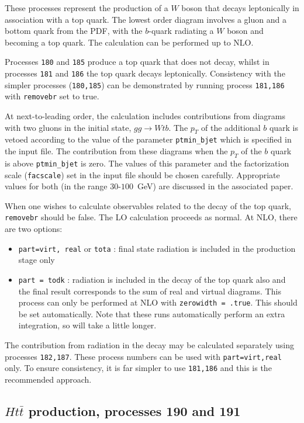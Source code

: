 \documentclass[12pt]{article}
\begin{document}
These processes represent the production of a $W$ boson that decays leptonically
in association with a top quark. The lowest order diagram involves a gluon and
a bottom quark from the PDF, with the $b$-quark radiating a $W$ boson and
becoming a top quark. The calculation can be performed up to NLO.

Processes {\tt 180} and {\tt 185} produce a top quark that does not decay,
whilst in processes {\tt 181} and {\tt 186} the top quark decays leptonically.
Consistency with
the simpler processes ({\tt 180,185}) can be demonstrated by running process
{\tt 181,186} with {\tt removebr} set to true.

At next-to-leading order, the calculation includes contributions from diagrams
with two gluons in the initial state, $gg \rightarrow Wtb$. The $p_T$ of the
additional $b$ quark is vetoed according to the value of the parameter
{\tt ptmin\_bjet} which is specified in the input file. The contribution from
these diagrams when the $p_T$ of the $b$ quark is above {\tt ptmin\_bjet}
is zero. The values of this parameter and the factorization scale ({\tt facscale})
set in the input file should be chosen carefully. Appropriate values for both
(in the range $30$-$100$~GeV) are discussed in the associated paper.

When one wishes to calculate observables related to the decay of the top
quark, {\tt removebr} should be false.
The LO calculation proceeds as normal. At NLO, there are two options:
\begin{itemize}
\item {\tt part=virt, real} or {\tt tota} : final state radiation is included
in the production stage only
\item {\tt part = todk} : radiation is included in the decay of the top
quark also and the final result corresponds to the sum of real and virtual
diagrams. This process can only be performed at NLO with 
{\tt zerowidth = .true}. This should be set automatically.
Note that these runs automatically perform an extra integration, so
will take a little longer.
\end{itemize}

The contribution from radiation in the decay may be calculated separately using
processes {\tt 182,187}. These process numbers can be used with {\tt part=virt,real}
only. To ensure consistency, it is far simpler to use {\tt 181,186}
and this is the recommended approach.

\subsection{$Ht{\bar t}$ production, processes 190 and 191}
\label{subsec:htt}
\end{document}
